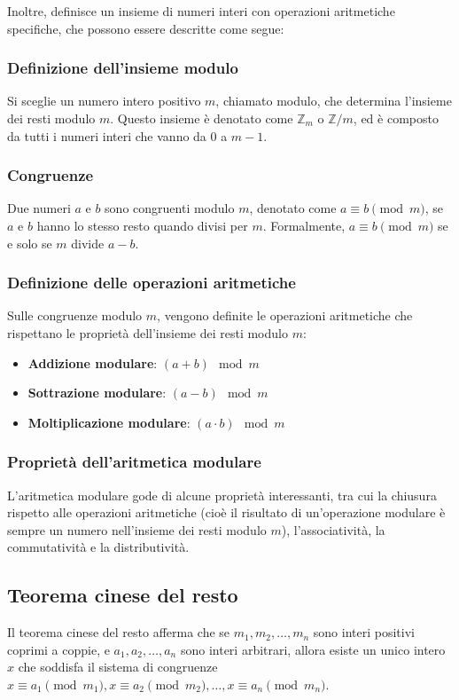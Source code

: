 \documentclass[a4paper,12pt]{report}
\begin{document}
Inoltre, definisce un insieme di numeri interi con operazioni aritmetiche specifiche, che possono essere descritte come segue:

\subsubsection*{Definizione dell'insieme modulo}
Si sceglie un numero intero positivo \(m\), chiamato modulo, che determina l'insieme dei resti modulo \(m\). 
Questo insieme è denotato come \(\mathbb{Z}_m\) o \(\mathbb{Z}/m\), ed è composto da tutti i numeri interi che vanno da 0 a \(m-1\).

\subsubsection*{Congruenze}
Due numeri \( a \) e \( b \) sono congruenti modulo \( m \), denotato come \( a \equiv b \pmod{m} \), se \( a \) e \( b \) hanno lo stesso resto quando divisi per \( m \). Formalmente, \( a \equiv b \pmod{m} \) se e solo se \( m \) divide \( a - b \).

\subsubsection*{Definizione delle operazioni aritmetiche}
Sulle congruenze modulo \(m\), vengono definite le operazioni aritmetiche che rispettano le proprietà dell'insieme dei resti modulo \(m\):
\begin{itemize}
	\item \textbf{Addizione modulare}: \( (a + b) \mod m \)
	\item \textbf{Sottrazione modulare}: \( (a - b) \mod m \)
	\item \textbf{Moltiplicazione modulare}: \( (a \cdot b) \mod m \)
\end{itemize}

\subsubsection*{Proprietà dell'aritmetica modulare}
L'aritmetica modulare gode di alcune proprietà interessanti, tra cui la chiusura rispetto alle operazioni aritmetiche (cioè il risultato di un'operazione modulare è sempre un numero nell'insieme dei resti modulo \(m\)), l'associatività, la commutatività e la distributività.
%
%
%
\subsection*{Teorema cinese del resto}
Il teorema cinese del resto afferma che se \( m_1, m_2, \ldots, m_n \) sono interi positivi coprimi a coppie, e \( a_1, a_2, \ldots, a_n \) sono interi arbitrari, allora esiste un unico intero \( x \) che soddisfa il sistema di congruenze \( x \equiv a_1 \pmod{m_1}, x \equiv a_2 \pmod{m_2}, \ldots, x \equiv a_n \pmod{m_n} \).
\end{document}
